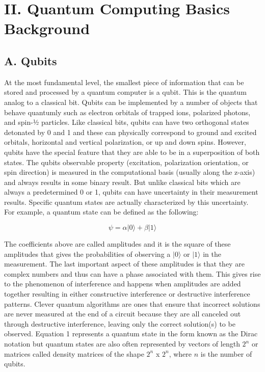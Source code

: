 \documentclass[
	a4paper, %
	10pt, %
	unnumberedsections, %
	twoside, %
]{LTJournalArticle}
\newcommand{\ket}[1]{\lvert#1\rangle} %
\begin{document}
\section{II. Quantum Computing Basics Background}

\subsection{A. Qubits}
At the most fundamental level, the smallest piece of information that can be stored and processed by a quantum computer is a qubit. This is the quantum analog to a classical bit. 
Qubits can be implemented by a number of objects that behave quantumly such as electron orbitals of trapped ions, polarized photons, and spin-½ particles. Like classical bits, 
qubits can have two orthogonal states detonated by 0 and 1 and these can physically correspond to ground and excited orbitals, horizontal and vertical polarization, or up and down 
spins. However, qubits have the special feature that they are able to be in a superposition of both states. The qubits observable property (excitation, polarization orientation, or 
spin direction) is measured in the computational basis (usually along the z-axis) and always results in some binary result. But unlike classical bits which are always a predetermined 
0 or 1, qubits can have uncertainty in their measurement results. Specific quantum states are actually characterized by this uncertainty. For example, a quantum state can be defined 
as the following: 

\begin{equation}
	\psi =\alpha\ket{0} + \beta\ket{1}
	\label{eq:quantumstate}
\end{equation}

The coefficients above are called amplitudes and it is the square of these amplitudes that gives the probabilities of observing a $\ket{0}$ or $\ket{1}$ in the measurement. The 
last important aspect of these amplitudes is that they are complex numbers and thus can have a phase associated with them. This gives rise to the phenomenon of interference and 
happens when amplitudes are added together resulting in either constructive interference or destructive interference patterns. Clever quantum algorithms are ones that ensure that 
incorrect solutions are never measured at the end of a circuit because they are all canceled out through destructive interference, leaving only the correct solution(s) to be 
observed. Equation 1 represents a quantum state in the form known as the Dirac notation but quantum states are also often represented by vectors of length $2^n$ or matrices called 
density matrices of the shape $2^n$ x $2^n$, where $n$ is the number of qubits.
\end{document}
